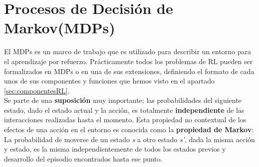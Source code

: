 \documentclass[11pt,fleqn]{book} %
\begin{document}
%
%
%	

\section{Procesos de Decisión de Markov(MDPs)}\label{sec:markov}

El MDPs es un marco de trabajo que es utilizado para describir un entorno para el aprendizaje por refuerzo. Prácticamente todos los problemas de RL pueden ser formalizados en MDPs o en una de sus extensiones, definiendo el formato de cada unos de sus componentes y funciones que hemos visto en el apartado \ref{sec:componentesRL}. \\

Se parte de una \textbf{suposición} muy importante; las probabilidades del siguiente estado, dado el estado actual y la acción, es totalmente \textbf{independiente} de las interacciones realizadas hasta el momento. Esta propiedad no contextual de los efectos de una acción en el entorno es conocida como la \textbf{propiedad de Markov}: La probabilidad de moverse de un estado \textit{s} a otro estado \textit{s'}, dada la misma acción y estado, es la misma independientemente de todos los estados previos y desarrollo del episodio encontrados hasta ese punto.
\end{document}
